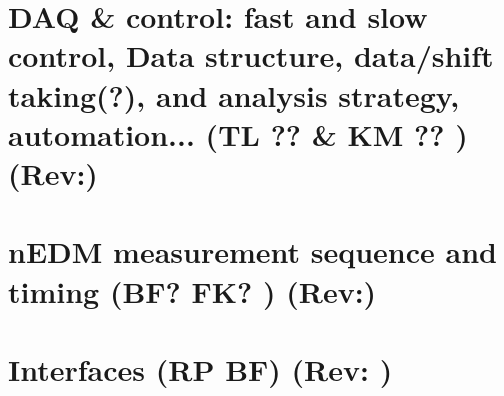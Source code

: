 \documentclass[11pt]{article}
\begin{document}
%



 \clearpage
\section{DAQ \& control: fast and slow control, Data structure, data/shift taking(?), and analysis strategy, automation...  {\color{red}(TL ?? \& KM ?? )} {\color{darkgreen}(Rev:)}} 
\label{sec:DAQ}
%





 \clearpage
\section{nEDM measurement sequence and timing
{\color{red}(BF? FK?  )} {\color{darkgreen}(Rev:)}} 
\label{sec:DAQ}


 \clearpage
\section{Interfaces {\color{red}(RP BF)} {\color{darkgreen}(Rev: )}} 
\label{sec:interfaces}

\end{document}
